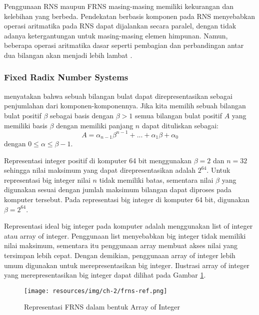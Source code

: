     Penggunaan RNS maupun FRNS masing-masing memiliki kekurangan dan kelebihan yang berbeda. Pendekatan berbasis komponen pada RNS menyebabkan operasi aritmatika pada RNS dapat dijalankan secara paralel, dengan tidak adanya ketergantungan untuk masing-masing elemen himpunan. Namun, beberapa operasi aritmatika dasar seperti pembagian dan perbandingan antar dua bilangan akan menjadi lebih lambat \citep{gpu_bignum}.

    \subsubsection{Fixed Radix Number Systems} \label{sec:frns}

      \citet{modern_comp_math} menyatakan bahwa sebuah bilangan bulat dapat direpresentasikan sebagai penjumlahan dari komponen-komponennya. Jika kita memilih sebuah bilangan bulat positif $\beta$ sebagai basis dengan $\beta > 1 $ semua bilangan bulat positif $A$ yang memiliki basis $\beta$ dengan memiliki panjang $n$ dapat dituliskan sebagai:
      \begin{equation} \label{eq:frns_rep}
        A = \alpha_{n-1}\beta^{n-1}+...+\alpha_{1}\beta+\alpha_{0}
      \end{equation}
      dengan $0 \leq \alpha \leq \beta -1$.

      Representasi integer positif di komputer 64 bit menggunakan $\beta = 2$ dan $n = 32$ sehingga nilai maksimum yang dapat direpresentasikan adalah $2^{64}$. Untuk representasi big integer nilai $n$ tidak memiliki batas, sementara nilai $\beta$ yang digunakan sesuai dengan jumlah maksimum bilangan dapat diproses pada komputer tersebut. Pada representasi big integer di komputer 64 bit, digunakan $\beta = 2^{64}$.

      Representasi ideal big integer pada komputer adalah menggunakan list of integer atau array of integer. Penggunaan list menyebabkan big integer tidak memiliki nilai maksimum, sementara itu penggunaan array membuat akses nilai yang tersimpan lebih cepat. Dengan demikian, penggunaan array of integer lebih umum digunakan untuk merepresentasikan big integer. Ilustrasi array of integer yang merepresentasikan big integer dapat dilihat pada Gambar \ref{fig:frns_ref}.

      \begin{figure}[h]
        \centering
        \texttt{[image: resources/img/ch-2/frns-ref.png]}
        \caption{Representasi FRNS dalam bentuk Array of Integer}
        \label{fig:frns_ref}
      \end{figure}

